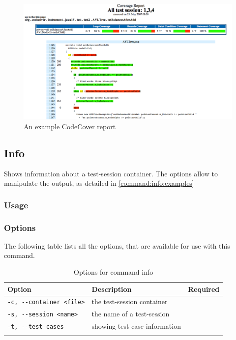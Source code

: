 \begin{figure}[htbp]
\begin{center}
\includegraphics[width = \textwidth]{images/report_example.png}
\caption{An example CodeCover report}
\label{command:re:fig:example}
\end{center}
\end{figure}



\subsection{Info}\label{Command-Info}
Shows information about a test-session container. The options allow to manipulate the output, as detailed in \ref{command:info:examples}~
\subsubsection{Usage}\label{command:info:usage}
\begin{quote}
\end{quote}

\subsubsection{Options}\label{command:info:options}
The following table lists all the options, that are available for use with this command.\\

\begin{longtable}{|l|p{4cm}|c|}\hline
   {\textbf{Option}} & 
   {\textbf{Description}} & 
   {\textbf{Required}} \\\hline \hline \endhead
   \verb$-c, --container <file>$ & the test-session container & \x \\\hline
   \verb$-s, --session <name>$ & the name of a test-session &  \\\hline
   \verb$-t, --test-cases$ & showing test case information &  \\\hline
  \caption{Options for command info}
  \label{fr_tb:Options for command info}
\end{longtable}
